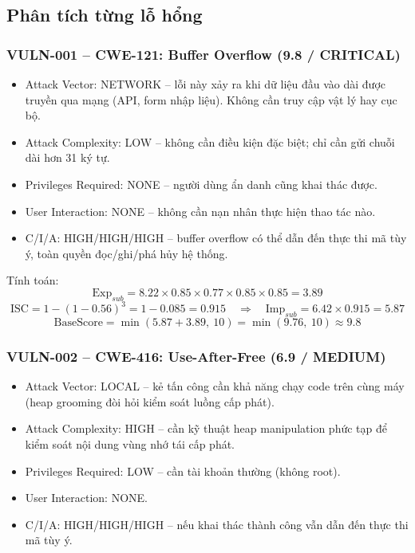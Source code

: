 \subsection{Phân tích từng lỗ hổng}

\subsubsection{VULN-001 -- CWE-121: Buffer Overflow (9.8 / CRITICAL)}

\begin{itemize}
    \item Attack Vector: NETWORK -- lỗi này xảy ra khi dữ liệu đầu vào
          dài được truyền qua mạng (API, form nhập liệu). Không cần truy cập vật
          lý hay cục bộ.
    \item Attack Complexity: LOW -- không cần điều kiện đặc biệt; chỉ
          cần gửi chuỗi dài hơn 31 ký tự.
    \item Privileges Required: NONE -- người dùng ẩn danh cũng khai thác
          được.
    \item User Interaction: NONE -- không cần nạn nhân thực hiện thao
          tác nào.
    \item C/I/A: HIGH/HIGH/HIGH -- buffer overflow có thể dẫn đến thực
          thi mã tùy ý, toàn quyền đọc/ghi/phá hủy hệ thống.
\end{itemize}

Tính toán:
\[
\mathrm{Exp}_{sub} = 8.22 \times 0.85 \times 0.77 \times 0.85 \times 0.85 = 3.89
\]
\[
\mathrm{ISC} = 1 - (1-0.56)^3 = 1 - 0.085 = 0.915 \quad \Rightarrow \quad
\mathrm{Imp}_{sub} = 6.42 \times 0.915 = 5.87
\]
\[
\mathrm{BaseScore} = \min(5.87 + 3.89,\ 10) = \min(9.76,\ 10) \approx 9.8
\]

\subsubsection{VULN-002 -- CWE-416: Use-After-Free (6.9 / MEDIUM)}

\begin{itemize}
    \item Attack Vector: LOCAL -- kẻ tấn công cần khả năng chạy code
          trên cùng máy (heap grooming đòi hỏi kiểm soát luồng cấp phát).
    \item Attack Complexity: HIGH -- cần kỹ thuật heap manipulation
          phức tạp để kiểm soát nội dung vùng nhớ tái cấp phát.
    \item Privileges Required: LOW -- cần tài khoản thường (không root).
    \item User Interaction: NONE.
    \item C/I/A: HIGH/HIGH/HIGH -- nếu khai thác thành công vẫn dẫn
          đến thực thi mã tùy ý.
\end{itemize}


